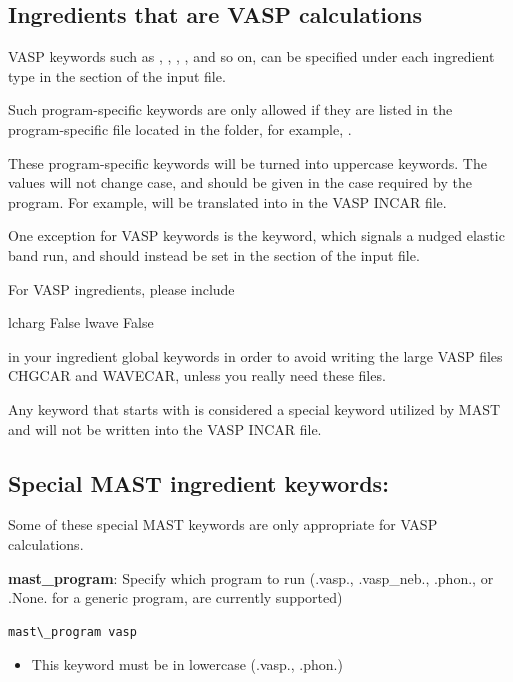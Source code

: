 \documentclass[letterpaper,10pt,english]{sphinxmanual}
\begin{document}
\subsection{Ingredients that are VASP calculations}
\label{3_0_inputfile:ingredients-that-are-vasp-calculations}
VASP keywords such as , , , , and so on, can be specified under each ingredient type in the  section of the input file.

Such program-specific keywords are only allowed if they are listed in the program-specific file located in the  folder, for example, .

These program-specific keywords will be turned into uppercase keywords. The values will not change case, and should be given in the case required by the program. For example,  will be translated into  in the VASP INCAR file.

One exception for VASP keywords is the  keyword, which signals a nudged elastic band run, and should instead be set in the  section of the input file.

For VASP ingredients, please include

lcharg False
lwave False

in your ingredient global keywords in order to avoid writing the large VASP files CHGCAR and WAVECAR, unless you really need these files.

Any keyword that starts with  is considered a special keyword utilized by MAST and will not be written into the VASP INCAR file.


\subsection{Special MAST ingredient keywords:}
\label{3_0_inputfile:special-mast-ingredient-keywords}
Some of these special MAST keywords are only appropriate for VASP calculations.

\textbf{mast\_program}: Specify which program to run (.vasp., .vasp\_neb., .phon., or .None. for a generic program, are currently supported)

\begin{Verbatim}[commandchars=\\\{\}]
mast\_program vasp
\end{Verbatim}
\begin{itemize}
\item {} 
This keyword must be in lowercase (.vasp., .phon.)

\end{itemize}
\end{document}
